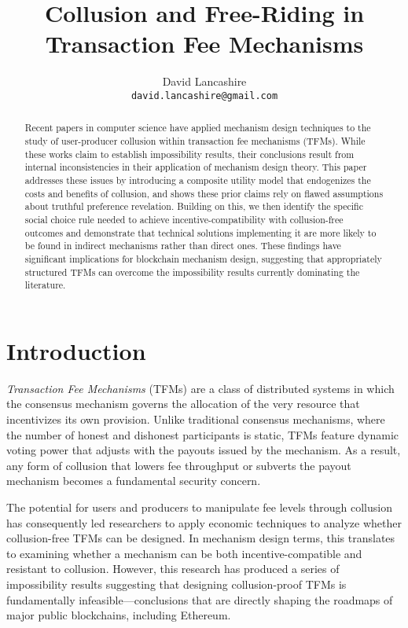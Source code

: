 \documentclass[oneside]{article}   	%
\title{Collusion and Free-Riding in Transaction Fee Mechanisms}
\author{
  David Lancashire\\
  \texttt{david.lancashire@gmail.com}\\
}
\begin{document}
\maketitle


\begin{abstract}
Recent papers in computer science have applied mechanism design techniques to the study of user-producer collusion within transaction fee mechanisms (TFMs). While these works claim to establish impossibility results, their conclusions result from internal inconsistencies in their application of mechanism design theory. This paper addresses these issues by introducing a composite utility model that endogenizes the costs and benefits of collusion, and shows these prior claims rely on flawed assumptions about truthful preference revelation. Building on this, we then identify the specific social choice rule needed to achieve incentive-compatibility with collusion-free outcomes and demonstrate that technical solutions implementing it are more likely to be found in indirect mechanisms rather than direct ones. These findings have significant implications for blockchain mechanism design, suggesting that appropriately structured TFMs can overcome the impossibility results currently dominating the literature.
\end{abstract}

\section{Introduction \label{sec::introduction}}

\emph{Transaction Fee Mechanisms} (TFMs) are a class of distributed systems in which the consensus mechanism governs the allocation of the very resource that incentivizes its own provision. Unlike traditional consensus mechanisms, where the number of honest and dishonest participants is static, TFMs feature dynamic voting power that adjusts with the payouts issued by the mechanism. As a result, any form of collusion that lowers fee throughput or subverts the payout mechanism becomes a fundamental security concern.

The potential for users and producers to manipulate fee levels through collusion has consequently led researchers to apply economic techniques to analyze whether collusion-free TFMs can be designed. In mechanism design terms, this translates to examining whether a mechanism can be both incentive-compatible and resistant to collusion. However, this research has produced a series of impossibility results suggesting that designing collusion-proof TFMs is fundamentally infeasible—conclusions that are directly shaping the roadmaps of major public blockchains, including Ethereum.
\end{document}
